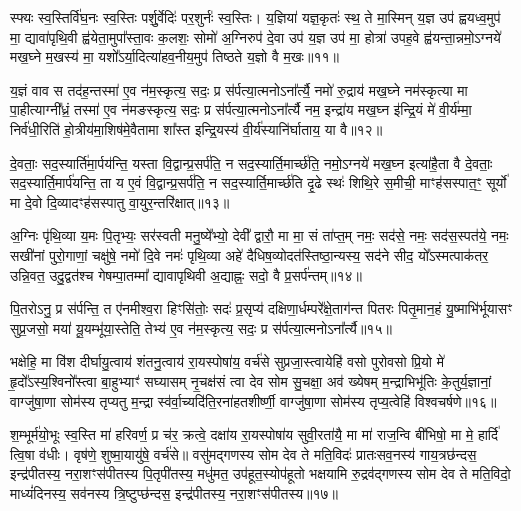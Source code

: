स्फ्यः स्व॒स्तिर्वि॑घ॒नः स्व॒स्तिः पर्\mbox{}शु॒र्वेदिः॑ पर॒शुर्नः॑ स्व॒स्तिः। य॒ज्ञिया॑ यज्ञ॒कृतः॑ स्थ॒ ते मा॒स्मिन् य॒ज्ञ उप॑ ह्वयध्व॒मुप॑ मा॒ द्यावा॑पृथि॒वी ह्व॑येता॒मुपा᳚स्ता॒वः क॒लशः॒ सोमो॑ अ॒ग्निरुप॑ दे॒वा उप॑ य॒ज्ञ उप॑ मा॒ होत्रा॑ उपह॒वे ह्व॑यन्ता॒न्नमो॒\-ऽग्नये॑ मख॒घ्ने म॒खस्य॑ मा॒ यशो᳚\-ऽर्या॒दित्या॑हव॒नीय॒मुप॑ तिष्ठते य॒ज्ञो वै म॒खः॥११॥

य॒ज्ञं वाव स तद॑ह॒न्तस्मा॑ ए॒व न॑म॒स्कृत्य॒ सदः॒ प्र स॑र्पत्या॒त्मनो\-ऽना᳚र्त्यै॒ नमो॑ रु॒द्राय॑ मख॒घ्ने नम॑स्कृत्या मा पा॒हीत्याग्नी᳚ध्रं॒ तस्मा॑ ए॒व न॑मङस्कृत्य॒ सदः॒ प्र स॑र्पत्या॒त्मनो\-ऽना᳚र्त्यै नम॒ इन्द्रा॑य मख॒घ्न इ॑न्द्रि॒यं मे॑ वी॒र्य॑म्मा॒ निर्व॑धी॒रिति॑ हो॒त्रीय॑मा॒शिष॑मे॒वैतामा शा᳚स्त इन्द्रि॒यस्य॑ वी॒र्य॑स्यानि॑र्घाताय॒ या वै॥१२॥

दे॒वताः॒ सद॒स्यार्ति॑मा॒र्पय॑न्ति॒ यस्ता वि॒द्वान्प्र॒सर्प॑ति॒ न सद॒स्यार्ति॒मार्च्छ॑ति॒ नमो॒\-ऽग्नये॑ मख॒घ्न इत्या॑है॒ता वै दे॒वताः॒ सद॒स्यार्ति॒मार्प॑यन्ति॒ ता य ए॒वं वि॒द्वान्प्र॒सर्प॑ति॒ न सद॒स्यार्ति॒मार्च्छ॑ति दृ॒ढे स्थः॑ शिथि॒रे स॒मीची॒ माꣳह॑सस्पात॒ꣳ॒ सूर्यो॑ मा दे॒वो दि॒व्यादꣳह॑सस्पातु वा॒युर॒न्तरि॑क्षात्॥१३॥

अ॒ग्निः पृ॑थि॒व्या य॒मः पि॒तृभ्यः॒ सर॑स्वती मनु॒ष्ये᳚भ्यो॒ देवी᳚ द्वारौ॒ मा मा॒ सं ता॑प्त॒म् नमः॒ सद॑से॒ नमः॒ सद॑स॒स्पत॑ये॒ नमः॒ सखी॑नां पुरो॒गाणां॒ चक्षु॑षे॒ नमो॑ दि॒वे नमः॑ पृथि॒व्या अहे॑ दैधिष॒व्योदत॑स्तिष्ठा॒न्यस्य॒ सद॑ने सीद॒ यो᳚\-ऽस्मत्पाक॑तर॒ उन्नि॒वत॒ उदु॒द्वत॑श्च गेषम्पा॒तम्मा᳚ द्यावापृथिवी अ॒द्याह्नः॒ सदो॒ वै प्र॒सर्प॑न्तम्॥१४॥

पि॒तरो\-ऽनु॒ प्र स॑र्पन्ति॒ त ए॑नमीश्व॒रा हिꣳसि॑तोः॒ सदः॑ प्र॒सृप्य॑ दक्षिणा॒र्धम्परे᳚क्षे॒ताग॑न्त पितरः पितृ॒मान॒हं यु॒ष्माभि॑र्भूयासꣳ सुप्र॒जसो॒ मया॑ यू॒यम्भू॑या॒स्तेति॒ तेभ्य॑ ए॒व न॑म॒स्कृत्य॒ सदः॒ प्र स॑र्पत्या॒त्मनो\-ऽना᳚र्त्यै॥१५॥

{\anuvakamend[{म॒खो वा अ॒न्तरि॑क्षात्प्र॒सर्प॑न्त॒न्त्रय॑स्त्रिꣳशच्च॥४॥}]}

भक्षेहि॒ मा वि॑श दीर्घायु॒त्वाय॑ शंतनु॒त्वाय॑ रा॒यस्पोषा॑य॒ वर्च॑से सुप्रजा॒स्त्वायेहि॑ वसो पुरोवसो प्रि॒यो मे॑ हृ॒दो᳚\-ऽस्य॒श्विनो᳚स्त्वा बा॒हुभ्याꣳ॑ सघ्यासम् नृ॒चक्ष॑सं त्वा देव सोम सु॒चक्षा॒ अव॑ ख्येषम् म॒न्द्राभिभू॑तिः के॒तुर्य॒ज्ञानां॒ वाग्जु॑षा॒णा सोम॑स्य तृप्यतु म॒न्द्रा स्व॑र्वा॒च्यदि॑ति॒रना॑हतशीर्ष्णी॒ वाग्जु॑षा॒णा सोम॑स्य तृप्य॒त्वेहि॑ विश्वचर्\mbox{}षणे॥१६॥

श॒म्भूर्म॑यो॒भूः स्व॒स्ति मा॑ हरिवर्ण॒ प्र च॑र॒ क्रत्वे॒ दक्षा॑य रा॒यस्पोषा॑य सुवी॒रता॑यै॒ मा मा॑ राज॒न्वि बी॑भिषो॒ मा मे॒ हार्दि॑ त्वि॒षा व॑धीः। वृष॑णे॒ शुष्मा॒यायु॑षे॒ वर्च॑से॥ वसु॑मद्गणस्य सोम देव ते मति॒विदः॑ प्रातःसव॒नस्य॑ गाय॒त्रछ॑न्दस॒ इन्द्र॑पीतस्य॒ नरा॒शꣳस॑पीतस्य पि॒तृपी॑तस्य॒ मधु॑मत॒ उप॑हूत॒स्योप॑हूतो भक्षयामि रु॒द्रव॑द्गणस्य सोम देव ते मति॒विदो॒ माध्यं॑दिनस्य॒ सव॑नस्य त्रि॒ष्टुप्छ॑न्दस॒ इन्द्र॑पीतस्य॒ नरा॒शꣳस॑पीतस्य॥१७॥

